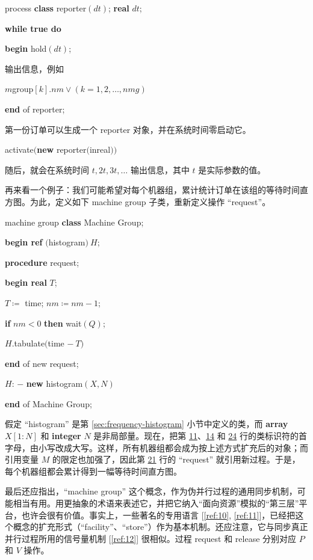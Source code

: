 \documentclass[twoside,11pt,fontset=none]{ctexbook}
\begin{document}
\quad process \textbf{class} reporter$(dt)$; \textbf{real} $dt$;

\quad \textbf{while true do}

\quad \textbf{}\textbf{begin} hold$(dt)$;

\quad \quad 输出信息，例如

\quad \quad $m$group$[k].nm \lor (k = 1, 2, \dots,nmg)$

\quad \textbf{end} of reporter;

第一份订单可以生成一个 reporter 对象，并在系统时间零启动它。

\quad activate$($\textbf{new} reporter$($inreal$))$

\noindent
随后，就会在系统时间 $t, 2t, 3t, \dots$ 输出信息，其中 $t$ 是实际参数的值。

再来看一个例子：我们可能希望对每个机器组，累计统计订单在该组的等待时间直方图。为此，定义如下 machine group 子类，重新定义操作 ``request''。

\quad machine group \textbf{class} Machine Group;

\quad \textbf{begin ref} $($histogram$)\ H$;

\quad \quad \textbf{procedure} request;

\quad \quad \textbf{begin real} $T$;

\quad \quad \quad $T\coloneq$ time; $nm\coloneq nm - 1$;

\quad \quad \quad \textbf{if} $nm < 0$ \textbf{then} wait$(Q)$;

\quad \quad \quad $H$.tabulate$($time $-\ T)$

\quad \quad \textbf{end} of new request;

\quad \quad $H$: $-$ \textbf{new} histogram$(X, N)$

\quad \textbf{end} of Machine Group;

假定 ``histogram'' 是第 \ref{sec:frequency-histogram} 小节中定义的类，而 \textbf{array} $X[1 : N]$ 和 \textbf{integer} $N$ 是非局部量。现在，把第 \hyperref[pg:program-job-shop-11]{11}、\hyperref[pg:program-job-shop-14]{14} 和 \hyperref[pg:program-job-shop-24]{24} 行的类标识符的首字母，由小写改成大写。这样，所有机器组都会成为按上述方式扩充后的对象；而引用变量 $M$ 的限定也加强了，因此第 \hyperref[pg:program-job-shop-21]{21} 行的 ``request'' 就引用新过程。于是，每个机器组都会累计得到一幅等待时间直方图。

最后还应指出，``machine group'' 这个概念，作为伪并行过程的通用同步机制，可能相当有用。用更抽象的术语来表述它，并把它纳入“面向资源”模拟的“第三层”平台，也许会很有价值。事实上，一些著名的专用语言 [\ref{ref:10}, \ref{ref:11}]，已经把这个概念的扩充形式（``facility''、``store''）作为基本机制。还应注意，它与同步真正并行过程所用的信号量机制 [\ref{ref:12}] 很相似。过程 request 和 release 分别对应 $P$ 和 $V$ 操作。
\end{document}
